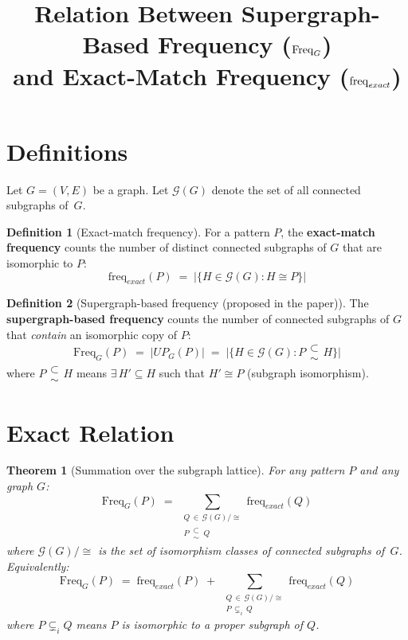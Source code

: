 \documentclass[11pt,a4paper]{article}
\title{Relation Between Supergraph-Based Frequency ($\Freq_G$)\\and Exact-Match Frequency ($\freq_{exact}$)}
\author{}
\date{}
\theoremstyle{plain}
\newtheorem{theorem}{Theorem}
\theoremstyle{definition}
\newtheorem{definition}{Definition}
\newcommand{\Freq}{\mathrm{Freq}}
\newcommand{\freq}{\mathrm{freq}}
\newcommand{\GG}{\mathcal{G}}
\newcommand\subsetsim{\mathrel{\substack{
  \textstyle\subset\\[-0.2ex]\textstyle\sim}}}
\begin{document}
\maketitle

\section{Definitions}

Let $G = (V, E)$ be a graph. Let $\GG(G)$ denote the set of all connected subgraphs of~$G$.

\begin{definition}[Exact-match frequency]
For a pattern $P$, the \textbf{exact-match frequency} counts the number of distinct connected subgraphs of $G$ that are isomorphic to $P$:
\[
\freq_{exact}(P) \;=\; \big|\{H \in \GG(G) : H \cong P\}\big|
\]
\end{definition}

\begin{definition}[Supergraph-based frequency (proposed in the paper)]
The \textbf{supergraph-based frequency} counts the number of connected subgraphs of $G$ that \emph{contain} an isomorphic copy of $P$:
\[
\Freq_G(P) \;=\; |UP_G(P)| \;=\; \big|\{H \in \GG(G) : P \subsetsim H\}\big|
\]
where $P \subsetsim H$ means $\exists\, H' \subseteq H$ such that $H' \cong P$ (subgraph isomorphism).
\end{definition}

\section{Exact Relation}

\begin{theorem}[Summation over the subgraph lattice]\label{thm:relation}
For any pattern $P$ and any graph $G$:
\[
\boxed{\;\Freq_G(P) \;=\; \sum_{\substack{Q \,\in\, \GG(G)/{\cong} \\[2pt] P \,\subsetsim\, Q}} \freq_{exact}(Q)\;}
\]
where $\GG(G)/{\cong}$ is the set of isomorphism classes of connected subgraphs of~$G$. Equivalently:
\[
\Freq_G(P) \;=\; \freq_{exact}(P) \;+\; \sum_{\substack{Q \,\in\, \GG(G)/{\cong} \\[2pt] P \,\subsetneq_i\, Q}} \freq_{exact}(Q)
\]
where $P \subsetneq_i Q$ means $P$ is isomorphic to a \emph{proper} subgraph of $Q$.
\end{theorem}
\end{document}
